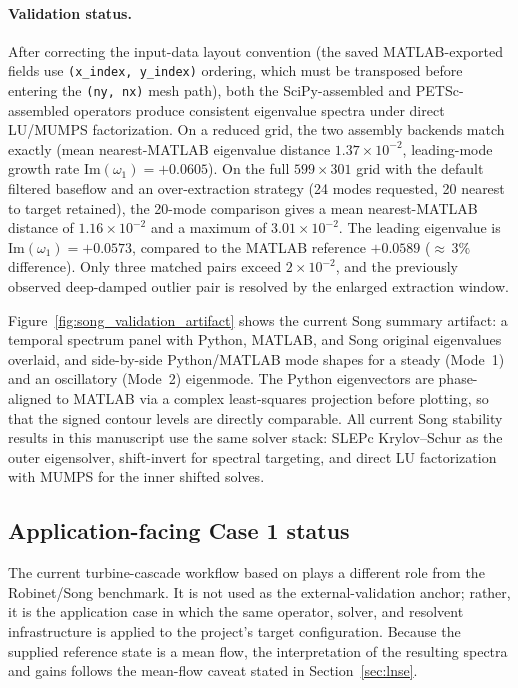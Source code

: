 \documentclass[11pt]{article}
\begin{document}
\paragraph{Validation status.}
After correcting the input-data layout convention (the saved MATLAB-exported
fields use \texttt{(x\_index, y\_index)} ordering, which must be transposed
before entering the \texttt{(ny, nx)} mesh path), both the SciPy-assembled
and PETSc-assembled operators produce consistent eigenvalue spectra under
direct LU/MUMPS factorization. On a reduced grid, the two assembly backends
match exactly (mean nearest-MATLAB eigenvalue distance $1.37 \times 10^{-2}$,
leading-mode growth rate $\mathrm{Im}(\omega_1) = +0.0605$). On the full
$599 \times 301$ grid with the default filtered baseflow and an
over-extraction strategy (24 modes requested, 20 nearest to target retained),
the 20-mode comparison gives a mean nearest-MATLAB distance of
$1.16 \times 10^{-2}$ and a maximum of $3.01 \times 10^{-2}$. The leading
eigenvalue is $\mathrm{Im}(\omega_1) = +0.0573$, compared to the MATLAB
reference $+0.0589$ (${\approx}\,3\%$ difference). Only three matched pairs
exceed $2 \times 10^{-2}$, and the previously observed deep-damped outlier
pair is resolved by the enlarged extraction window.

Figure~\ref{fig:song_validation_artifact} shows the current Song summary
artifact: a temporal spectrum panel with Python, MATLAB, and Song original
eigenvalues overlaid, and side-by-side Python/MATLAB mode shapes for
a steady (Mode~1) and an oscillatory (Mode~2) eigenmode. The Python
eigenvectors are phase-aligned to MATLAB via a complex least-squares
projection before plotting, so that the signed contour levels are directly
comparable. All current Song stability results in this manuscript use the
same solver stack: SLEPc Krylov--Schur as the outer eigensolver, shift-invert
for spectral targeting, and direct LU factorization with MUMPS for the inner
shifted solves.

\subsection{Application-facing Case 1 status}
\label{sec:case1}

The current turbine-cascade workflow based on \citet{lui2022unsteadiness}
plays a different role from the Robinet/Song benchmark. It is not used as
the external-validation anchor; rather, it is the application case in which the
same operator, solver, and resolvent infrastructure is applied to the
project's target configuration. Because the supplied reference state is
a mean flow, the interpretation of the resulting spectra and gains follows the
mean-flow caveat stated in Section~\ref{sec:lnse}.
\end{document}
